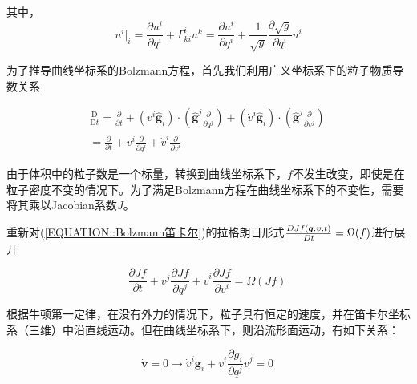 \documentclass[LBMDerivation.tex]{subfiles}
\begin{document}
其中，
\begin{equation}
  u^{i}|_{i}=\frac{\partial u^{i}}{\partial q^{i}}+\Gamma_{k i}^{i} u^{k}=\frac{\partial u^{i}}{\partial q^{i}}+\frac{1}{\sqrt{g}} \frac{\partial \sqrt{g}}{\partial q^{i}} u^{i}
\end{equation}







为了推导曲线坐标系的Bolzmann方程，首先我们利用广义坐标系下的粒子物质导数关系

\begin{equation}
  \begin{aligned}
    \frac{\mathrm{D}}{\mathrm{D} t}=\frac{\partial}{\partial t}+\left(v^{i} \widehat{\boldsymbol{g}}_{i}\right) \cdot\left(\widehat{\boldsymbol{g}}^{j} \frac{\partial}{\partial q^{j}}\right)+\left(\dot{v}^{i} \widehat{\boldsymbol{g}}_{i}\right) \cdot\left(\widehat{\boldsymbol{g}}^{j} \frac{\partial}{\partial v^{j}}\right) \\
    =\frac{\partial}{\partial t}+v^{i} \frac{\partial}{\partial q^{i}} + \dot{v}^{i} \frac{\partial}{\partial  v^{i}}
  \end{aligned}
  \label{EQUATION::广义物质导数} ~
\end{equation}


由于体积中的粒子数是一个标量，转换到曲线坐标系下，$f$不发生改变，即使是在粒子密度不变的情况下。为了满足Bolzmann方程在曲线坐标系下的不变性，需要将其乘以Jacobian系数$J$。

重新对(\ref{EQUATION::Bolzmann笛卡尔})的拉格朗日形式${D Jf(\boldsymbol{q}, \boldsymbol{v}, t) \over Dt} =\Omega(f)$进行展开

\begin{equation}
  \frac{\partial Jf}{\partial t}+v^{j} \frac{\partial Jf}{\partial q^{j}} + \dot{v}^{i} \frac{\partial Jf}{\partial  v^{i}} =\Omega(Jf)
  \label{EQUATION::Bolzmann中间过程2} ~
\end{equation}

%
%
根据牛顿第一定律，在没有外力的情况下，粒子具有恒定的速度，并在笛卡尔坐标系（三维）中沿直线运动。但在曲线坐标系下，则沿流形面运动，有如下关系：

%
%
\begin{equation}
  \dot{\boldsymbol{v}}=0 \rightarrow \dot{v}^{i}\boldsymbol{g}_{i}+v^{i} \frac{\partial g_{i}}{\partial q^{j}} v^{j}=0
  \label{EQUATION::A.3} ~
\end{equation}
%
\end{document}
